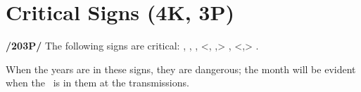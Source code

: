 \section{Critical Signs (4K, 3P)}

\textbf{/203P/} The following signs are critical: \Aries, \Taurus, \Cancer, <\Leo, \Libra,> \Scorpio, <\Capricorn,> \Aquarius. 

When the years are in these signs, they are dangerous; the month will be evident when the \Sun\, is in them at the transmissions.

\newpage